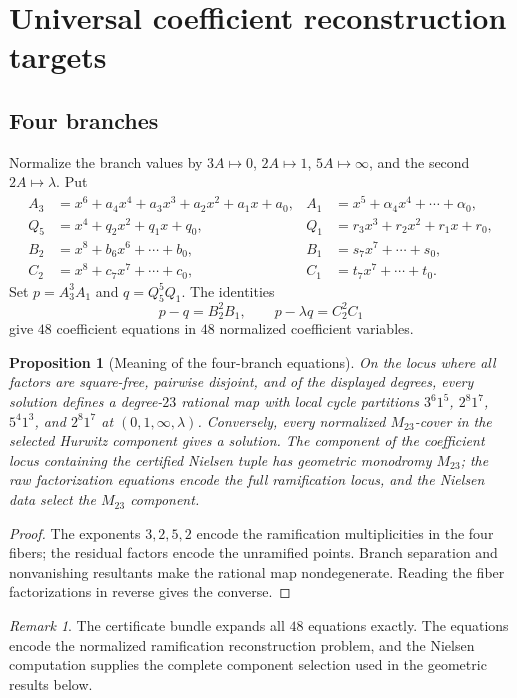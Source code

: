 \documentclass[11pt]{article}
\newtheorem{proposition}[theorem]{Proposition}
\theoremstyle{remark}
\newtheorem{remark}[theorem]{Remark}
\begin{document}
\section{Universal coefficient reconstruction targets}\label{sec:coefficients}

\subsection{Four branches}
Normalize the branch values by $3A\mapsto0$, $2A\mapsto1$, $5A\mapsto\infty$, and the second $2A\mapsto\lambda$.  Put
\begin{align*}
 A_3&=x^6+a_4x^4+a_3x^3+a_2x^2+a_1x+a_0,
 &A_1&=x^5+\alpha_4x^4+\cdots+\alpha_0,\\
 Q_5&=x^4+q_2x^2+q_1x+q_0,
 &Q_1&=r_3x^3+r_2x^2+r_1x+r_0,\\
 B_2&=x^8+b_6x^6+\cdots+b_0,
 &B_1&=s_7x^7+\cdots+s_0,\\
 C_2&=x^8+c_7x^7+\cdots+c_0,
 &C_1&=t_7x^7+\cdots+t_0.
\end{align*}
Set $p=A_3^3A_1$ and $q=Q_5^5Q_1$.  The identities
\[
 p-q=B_2^2B_1,
 \qquad
 p-\lambda q=C_2^2C_1
\]
give $48$ coefficient equations in $48$ normalized coefficient variables.

\begin{proposition}[Meaning of the four-branch equations]\label{prop:coeff4}
On the locus where all factors are square-free, pairwise disjoint, and of the displayed degrees, every solution defines a degree-$23$ rational map with local cycle partitions $3^6 1^5$, $2^8 1^7$, $5^4 1^3$, and $2^8 1^7$ at $(0,1,\infty,\lambda)$.  Conversely, every normalized $M_{23}$-cover in the selected Hurwitz component gives a solution.  The component of the coefficient locus containing the certified Nielsen tuple has geometric monodromy $M_{23}$; the raw factorization equations encode the full ramification locus, and the Nielsen data select the $M_{23}$ component.
\end{proposition}

\begin{proof}
The exponents $3,2,5,2$ encode the ramification multiplicities in the four fibers; the residual factors encode the unramified points.  Branch separation and nonvanishing resultants make the rational map nondegenerate.  Reading the fiber factorizations in reverse gives the converse.
\end{proof}

\begin{remark}
The certificate bundle expands all $48$ equations exactly.  The equations encode the normalized ramification reconstruction problem, and the Nielsen computation supplies the complete component selection used in the geometric results below.
\end{remark}
\end{document}
